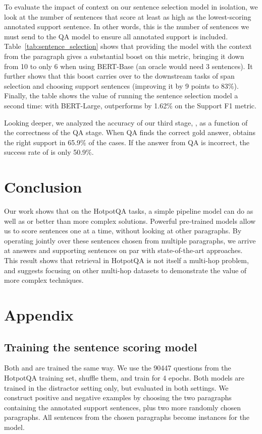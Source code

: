 \documentclass[11pt,a4paper]{article}
\newcommand{\hpqa}{HotpotQA\xspace}
\begin{document}
To evaluate the impact of context on our sentence selection model in isolation, we look at the number of sentences that score at least as high as the lowest-scoring annotated support sentence. In other words, this is the number of sentences we must send to the QA model to ensure all annotated support is included. Table~\ref{tab:sentence_selection} shows that providing the model with the context from the paragraph gives a substantial boost on this metric, bringing it down from 10 to only 6 when using BERT-Base (an oracle would need 3 sentences). It further shows that this boost carries over to the downstream tasks of span selection and choosing support sentences (improving it by 9 points to 83\%). Finally, the table shows the value of running the sentence selection model a second time: with BERT-Large,  outperforms  by 1.62\% on the Support F1 metric.

Looking deeper, we analyzed the accuracy of our third stage, , as a function of the correctness of the QA stage. When QA finds the correct gold answer,  obtains the right support in 65.9\% of the cases. If the answer from QA is incorrect, the success rate of  is only 50.9\%.


\section{Conclusion}

Our work shows that on the \hpqa tasks, a simple pipeline model can do as well as or better than more complex solutions. Powerful pre-trained models allow us to score sentences one at a time, without looking at other paragraphs. By operating jointly over these sentences chosen from multiple paragraphs, we arrive at answers and supporting sentences on par with state-of-the-art approaches. This result shows that retrieval in \hpqa is not itself a multi-hop problem, and suggests focusing on other multi-hop datasets to demonstrate the value of more complex techniques.





\newpage
\appendix

\section{Appendix}

\subsection{Training the sentence scoring model}
\label{appendix:training_sentence}
Both  and  are trained the same way. We use the 90447 questions from the \hpqa training set, shuffle them, and train for 4 epochs. Both models are trained in the distractor setting only, but evaluated in both settings. We construct positive and negative examples by choosing the two paragraphs containing the annotated support sentences, plus two more randomly chosen paragraphs. All sentences from the chosen paragraphs become instances for the model.
\end{document}
